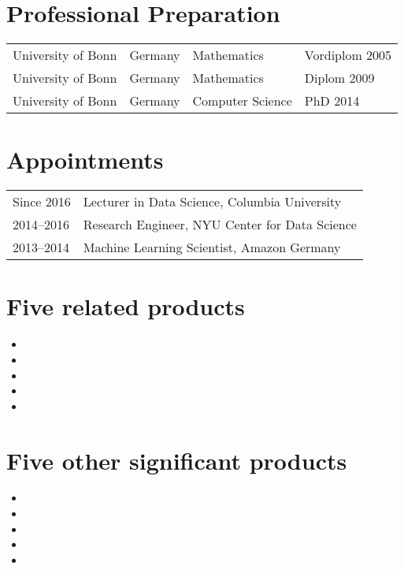 

\section*{Professional Preparation}
\begin{tabular}{l l l l}
University of Bonn& Germany& Mathematics     &  Vordiplom 2005\\
University of Bonn& Germany& Mathematics     &  Diplom 2009\\
University of Bonn& Germany& Computer Science&  PhD 2014\\
\end{tabular}

\section*{Appointments}
\begin{tabular}{l l}
Since 2016& Lecturer in Data Science, Columbia University\\
2014--2016& Research Engineer, NYU Center for Data Science\\
2013--2014& Machine Learning Scientist, Amazon Germany\\
\end{tabular}

\section*{Five related products}
\begin{itemize}
    \item {}
    \item {}  %
    \item {}            %
    \item {} %
    \item {}             
\end{itemize}
\pagebreak
\section*{Five other significant products}
\begin{itemize}
    \item {}
    \item {}
    \item {}
    \item {}
    \item {}
\end{itemize}

